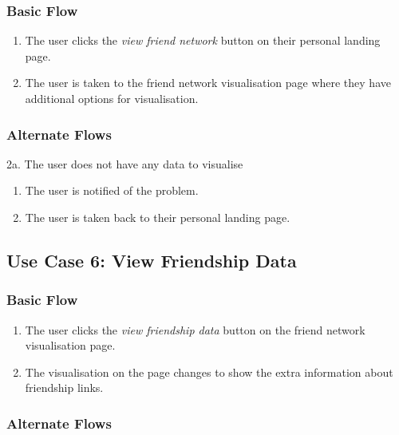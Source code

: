 \documentclass[12pt,onecolumn]{article}
\begin{document}
		\subsubsection{Basic Flow}

		\begin{enumerate}
			\item The user clicks the \emph{view friend network} button on their personal landing page.

			\item The user is taken to the friend network visualisation page where they have additional options for visualisation. 	

		\end{enumerate}

		\subsubsection{Alternate Flows}

		2a. The user does not have any data to visualise

		\begin{enumerate}
			\item The user is notified of the problem.

			\item The user is taken back to their personal landing page.

		\end{enumerate}

	\subsection{Use Case 6: View Friendship Data}

		\subsubsection{Basic Flow}

		\begin{enumerate}
			\item The user clicks the \emph{view friendship data} button on the friend network visualisation page.

			\item The visualisation on the page changes to show the extra information about friendship links. 	

		\end{enumerate}

		\subsubsection{Alternate Flows}
\end{document}
